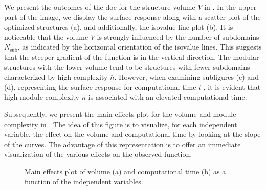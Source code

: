 We present the outcomes of the \gls{doe} for the structure volume $V$ in . In the upper part of the image, we display the surface response along with a scatter plot of the optimized structures (a), and additionally, the isovalue line plot (b). It is noticeable that the volume $V$ is strongly influenced by the number of subdomains $N_\text{sub}$, as indicated by the horizontal orientation of the isovalue lines. This suggests that the steeper gradient of the function is in the vertical direction. The modular structures with the lower volume tend to be structures with fewer subdomains characterized by high complexity $\bar{n}$. However, when examining subfigures (c) and (d), representing the surface response for computational time $t$ , it is evident that high module complexity $\bar{n}$ is associated with an elevated computational time.

Subsequently, we present the main effects plot for the volume and module complexity in . The idea of this figure is to visualize, for each independent variable, the effect on the volume and computational time by looking at the slope of the curves. The advantage of this representation is to offer an immediate visualization of the various effects on the observed function.
\begin{figure}
    \centering
    \bigskip
    \caption{Main effects plot of volume (a) and computational time (b) as a function of the independent variables.}
    \label{fig:05_doe_main_eff}
\end{figure}

